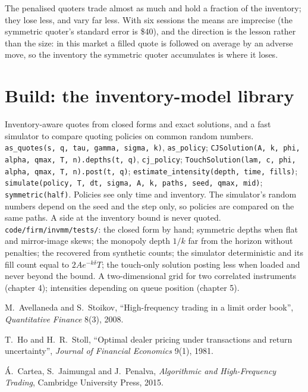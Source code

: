 The penalised quoters trade almost as much and hold a fraction of the inventory; they lose less, and vary far less. With six sessions the means are
imprecise (the symmetric quoter's standard error is \$40), and the direction is the lesson rather than the size: in this market a filled quote is
followed on average by an adverse move, so the inventory the symmetric quoter accumulates is where it loses.

\section{Build: the inventory-model library}\label{bld:hf:inventory-models:invmm}

\begin{build}
 Inventory-aware quotes from closed forms and exact solutions, and a fast simulator to compare quoting policies on common random
numbers.
 \texttt{as\_quotes(s, q, tau, gamma, sigma, k)}, \texttt{as\_policy}; \texttt{CJSolution(A, k, phi, alpha, qmax, T, n).depths(t, q)},
\texttt{cj\_policy}; \texttt{TouchSolution(lam, c, phi, alpha, qmax, T, n).post(t, q)}; \texttt{estimate\_intensity(depth, time, fills)};
\texttt{simulate(policy, T, dt, sigma, A, k, paths, seed, qmax, mid)}; \texttt{symmetric(half)}.
 Policies see only time and inventory. The simulator's random numbers depend on the seed and the step only, so policies are compared on
the same paths. A side at the inventory bound is never quoted.
 \texttt{code/firm/invmm/tests/}: the closed form by hand; symmetric depths when flat and mirror-image skews; the monopoly depth
$1/k$ far from the horizon without penalties; the  recovered from synthetic counts; the simulator deterministic and its fill count
equal to $2Ae^{-k\delta}T$; the touch-only solution posting less when loaded and never beyond the bound.
 A two-dimensional grid for two correlated instruments (chapter 4); intensities depending on queue position (chapter 5).
\end{build}

\begin{omsources}
\item M.~Avellaneda and S.~Stoikov, ``High-frequency trading in a limit order book'', \emph{Quantitative Finance} 8(3), 2008.
\item T.~Ho and H.~R.~Stoll, ``Optimal dealer pricing under transactions and return uncertainty'', \emph{Journal of Financial Economics} 9(1), 1981.
\item \'A.~Cartea, S.~Jaimungal and J.~Penalva, \emph{Algorithmic and High-Frequency Trading}, Cambridge University Press, 2015.
\end{omsources}


